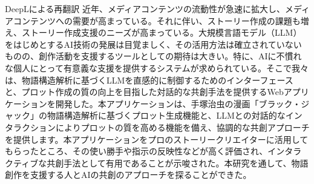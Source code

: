 DeepLによる再翻訳
近年、メディアコンテンツの流動性が急速に拡大し、メディアコンテンツへの需要が高まっている。それに伴い、ストーリー作成の課題も増え、ストーリー作成支援のニーズが高まっている。大規模言語モデル（LLM）をはじめとするAI技術の発展は目覚ましく、その活用方法は確立されていないものの、創作活動を支援するツールとしての期待は大きい。特に、AIに不慣れな個人にとって有意義な支援を提供するシステムが求められている。そこで我々は、物語構造解析に基づくLLMを直感的に制御するためのインターフェースと、プロット作成の質の向上を目指した対話的な共創手法を提供するWebアプリケーションを開発した。本アプリケーションは、手塚治虫の漫画「ブラック・ジャック」の物語構造解析に基づくプロット生成機能と、LLMとの対話的なインタラクションによりプロットの質を高める機能を備え、協調的な共創アプローチを提供します。本アプリケーションをプロのストーリークリエイターに活用してもらったところ、その使い勝手や指示の反映性などが高く評価され、インタラクティブな共創手法として有用であることが示唆された。本研究を通して、物語創作を支援する人とAIの共創のアプローチを探ることができた。